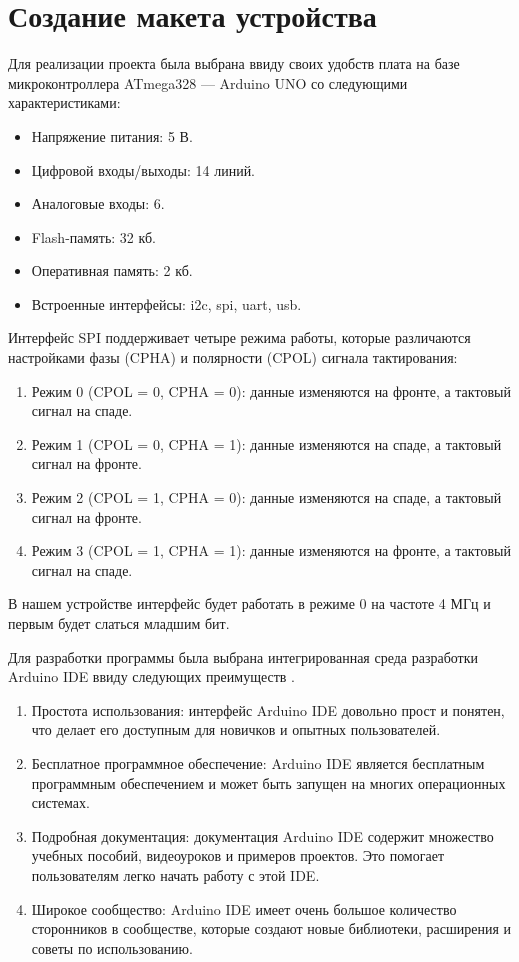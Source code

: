 \documentclass[14pt, oneside]{altsu-report}
\begin{document}
\chapter{Создание макета устройства} 
	Для реализации проекта была выбрана ввиду своих удобств плата на базе микроконтроллера ATmega328 --- Arduino UNO со следующими характеристиками\cite{uno}: 
	\begin{itemize}
		\item Напряжение питания: 5 В.
		\item Цифровой входы/выходы: 14 линий.
		\item Аналоговые входы: 6.
		\item Flash-память: 32 кб.
		\item Оперативная память: 2 кб.
		\item Встроенные интерфейсы: i2c, spi, uart, usb.
	\end{itemize}
	
		Интерфейс SPI поддерживает четыре режима работы, которые различаются настройками фазы (CPHA) и полярности (CPOL) сигнала тактирования\cite{spi}:
	\begin{enumerate}
		\item Режим 0 (CPOL = 0, CPHA = 0): данные изменяются на фронте, а тактовый сигнал на спаде.
		\item Режим 1 (CPOL = 0, CPHA = 1): данные изменяются на спаде, а тактовый сигнал на фронте.
		\item Режим 2 (CPOL = 1, CPHA = 0): данные изменяются на спаде, а тактовый сигнал на фронте.
		\item Режим 3 (CPOL = 1, CPHA = 1): данные изменяются на фронте, а тактовый сигнал на спаде.
	\end{enumerate}
		В нашем устройстве интерфейс будет работать в режиме 0 на частоте 4 МГц и первым будет слаться младшим бит. 
	
	Для разработки программы была выбрана интегрированная среда разработки Arduino IDE ввиду следующих преимуществ \cite{ide}.
	\begin{enumerate}
		\item Простота использования: интерфейс Arduino IDE довольно прост и понятен, что делает его доступным для новичков и опытных пользователей.
		\item Бесплатное программное обеспечение: Arduino IDE является бесплатным программным обеспечением и может быть запущен на многих операционных системах.
		\item Подробная документация: документация Arduino IDE содержит множество учебных пособий, видеоуроков и примеров проектов. Это помогает пользователям легко начать работу с этой IDE.
		\item Широкое сообщество: Arduino IDE имеет очень большое количество сторонников в сообществе, которые создают новые библиотеки, расширения и советы по использованию.
	\end{enumerate}
	
\end{document}
